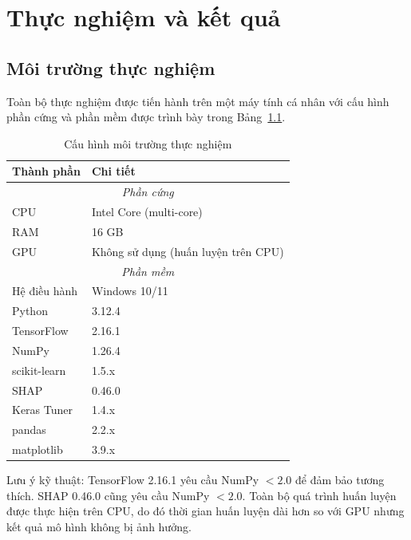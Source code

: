 
\chapter{Thực nghiệm và kết quả}
\label{chap:experiments}

\section{Môi trường thực nghiệm}
\label{sec:experiment_env}

Toàn bộ thực nghiệm được tiến hành trên một máy tính cá nhân với cấu hình phần cứng và phần mềm được trình bày trong Bảng~\ref{tab:hardware_software}.

\begin{table}[H]
\centering
\caption{Cấu hình môi trường thực nghiệm}
\label{tab:hardware_software}
\small
\begin{tabular}{|l|l|}
\hline
\textbf{Thành phần} & \textbf{Chi tiết} \\
\hline
\multicolumn{2}{|c|}{\textit{Phần cứng}} \\
\hline
CPU               & Intel Core (multi-core) \\
RAM               & 16 GB \\
GPU               & Không sử dụng (huấn luyện trên CPU) \\
\hline
\multicolumn{2}{|c|}{\textit{Phần mềm}} \\
\hline
Hệ điều hành     & Windows 10/11 \\
Python            & 3.12.4 \\
TensorFlow        & 2.16.1 \\
NumPy             & 1.26.4 \\
scikit-learn      & 1.5.x \\
SHAP              & 0.46.0 \\
Keras Tuner       & 1.4.x \\
pandas            & 2.2.x \\
matplotlib        & 3.9.x \\
\hline
\end{tabular}
\end{table}

Lưu ý kỹ thuật: TensorFlow 2.16.1 yêu cầu NumPy $< 2.0$ để đảm bảo tương thích. SHAP 0.46.0 cũng yêu cầu NumPy $< 2.0$. Toàn bộ quá trình huấn luyện được thực hiện trên CPU, do đó thời gian huấn luyện dài hơn so với GPU nhưng kết quả mô hình không bị ảnh hưởng.

